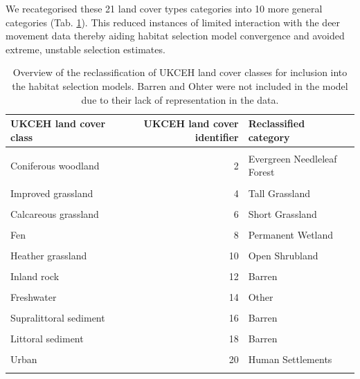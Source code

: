 \documentclass[10pt,a4paper]{article}
\begin{document}
We recategorised these 21 land cover types categories into 10 more general categories (Tab. \ref{tab:landcoverTable}).
This reduced instances of limited interaction with the deer movement data thereby aiding habitat selection model convergence and avoided extreme, unstable selection estimates.

\begingroup\fontsize{9}{11}\selectfont

\begin{longtable}[t]{lrl}
\caption{\label{tab:landcoverTable}Overview of the reclassification of UKCEH land cover classes for inclusion into the habitat selection models. Barren and Ohter were not included in the model due to their lack of representation in the data.}\\
\toprule
UKCEH land cover class & UKCEH land cover identifier & Reclassified category\\
\midrule
\cellcolor{gray!10}{Deciduous woodland} & \cellcolor{gray!10}{1} & \cellcolor{gray!10}{Deciduous Broadleaf Forest}\\
Coniferous woodland & 2 & Evergreen Needleleaf Forest\\
\cellcolor{gray!10}{Arable} & \cellcolor{gray!10}{3} & \cellcolor{gray!10}{Cropland}\\
Improved grassland & 4 & Tall Grassland\\
\cellcolor{gray!10}{Neutral grassland} & \cellcolor{gray!10}{5} & \cellcolor{gray!10}{Short Grassland}\\
\addlinespace
Calcareous grassland & 6 & Short Grassland\\
\cellcolor{gray!10}{Acid grassland} & \cellcolor{gray!10}{7} & \cellcolor{gray!10}{Short Grassland}\\
Fen & 8 & Permanent Wetland\\
\cellcolor{gray!10}{Heather} & \cellcolor{gray!10}{9} & \cellcolor{gray!10}{Open Shrubland}\\
Heather grassland & 10 & Open Shrubland\\
\addlinespace
\cellcolor{gray!10}{Bog} & \cellcolor{gray!10}{11} & \cellcolor{gray!10}{Permanent Wetland}\\
Inland rock & 12 & Barren\\
\cellcolor{gray!10}{Saltwater} & \cellcolor{gray!10}{13} & \cellcolor{gray!10}{Other}\\
Freshwater & 14 & Other\\
\cellcolor{gray!10}{Supralittoral rock} & \cellcolor{gray!10}{15} & \cellcolor{gray!10}{Barren}\\
\addlinespace
Supralittoral sediment & 16 & Barren\\
\cellcolor{gray!10}{Littoral rock} & \cellcolor{gray!10}{17} & \cellcolor{gray!10}{Barren}\\
Littoral sediment & 18 & Barren\\
\cellcolor{gray!10}{Saltmarsh} & \cellcolor{gray!10}{19} & \cellcolor{gray!10}{Permanent Wetland}\\
Urban & 20 & Human Settlements\\
\addlinespace
\cellcolor{gray!10}{Suburban} & \cellcolor{gray!10}{21} & \cellcolor{gray!10}{Human Settlements}\\
\bottomrule
\end{longtable}
\endgroup{}
\end{document}
